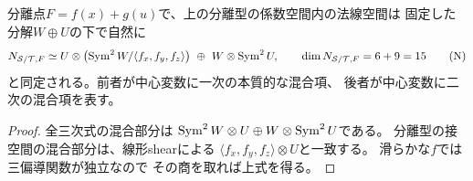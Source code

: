 \begin{corollary}[本質的な混合項の一次近似]
\label{cor:split-normal-directions}
分離点$F=f(x)+g(u)$で、上の分離型の係数空間内の法線空間は
固定した分解$W\oplus U$の下で自然に
\[
 N_{\mathcal S/\mathcal T,F}
 \simeq U\otimes\bigl(\operatorname{Sym}^2W/\langle f_x,f_y,f_z\rangle\bigr)
 \ \oplus\ W\otimes\operatorname{Sym}^2U,
 \qquad \dim N_{\mathcal S/\mathcal T,F}=6+9=15
 \tag{N}\label{eq:split-normal-directions}
\]
と同定される。前者が中心変数に一次の本質的な混合項、
後者が中心変数に二次の混合項を表す。
\end{corollary}
\begin{proof}
全三次式の混合部分は
$\operatorname{Sym}^2W\otimes U\oplus W\otimes\operatorname{Sym}^2U$である。
分離型の接空間の混合部分は、線形shearによる
$\langle f_x,f_y,f_z\rangle\otimes U$と一致する。
滑らかな$f$では三偏導関数が独立なので
その商を取れば上式を得る。
\end{proof}

